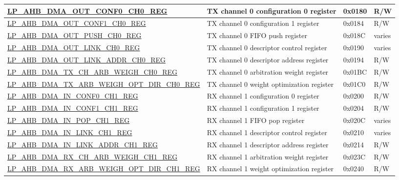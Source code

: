 \begin{longtable}{ | l | p{10cm} | p{1.3cm} | l | }
\hyperref[regdesc:LPAHBDMAOUTCONF0CHNREG]{LP\_AHB\_DMA\_OUT\_CONF0\_CH0\_REG} & TX channel 0 configuration 0 register & 0x0180 & R/W \\ \hline
\hyperref[regdesc:LPAHBDMAOUTCONF1CHNREG]{LP\_AHB\_DMA\_OUT\_CONF1\_CH0\_REG} & TX channel 0 configuration 1 register & 0x0184 & R/W \\ \hline
\hyperref[regdesc:LPAHBDMAOUTPUSHCHNREG]{LP\_AHB\_DMA\_OUT\_PUSH\_CH0\_REG} & TX channel 0 FIFO push register & 0x018C & varies \\ \hline
\hyperref[regdesc:LPAHBDMAOUTLINKCHNREG]{LP\_AHB\_DMA\_OUT\_LINK\_CH0\_REG} & TX channel 0 descriptor control register & 0x0190 & varies \\ \hline
\hyperref[regdesc:LPAHBDMAOUTLINKADDRCHNREG]{LP\_AHB\_DMA\_OUT\_LINK\_ADDR\_CH0\_REG} & TX channel 0 descriptor address register & 0x0194 & R/W \\ \hline
\hyperref[regdesc:LPAHBDMATXCHARBWEIGHCHNREG]{LP\_AHB\_DMA\_TX\_CH\_ARB\_WEIGH\_CH0\_REG} & TX channel 0 arbitration weight register & 0x01BC & R/W \\ \hline
\hyperref[regdesc:LPAHBDMATXARBWEIGHOPTDIRCHNREG]{LP\_AHB\_DMA\_TX\_ARB\_WEIGH\_OPT\_DIR\_CH0\_REG} & TX channel 0 weight optimization register & 0x01C0 & R/W \\ \hline
\hyperref[regdesc:LPAHBDMAINCONF0CHNREG]{LP\_AHB\_DMA\_IN\_CONF0\_CH1\_REG} & RX channel 1 configuration 0 register & 0x0200 & R/W \\ \hline
\hyperref[regdesc:LPAHBDMAINCONF1CHNREG]{LP\_AHB\_DMA\_IN\_CONF1\_CH1\_REG} & RX channel 1 configuration 1 register & 0x0204 & R/W \\ \hline
\hyperref[regdesc:LPAHBDMAINPOPCHNREG]{LP\_AHB\_DMA\_IN\_POP\_CH1\_REG} & RX channel 1 FIFO pop register & 0x020C & varies \\ \hline
\hyperref[regdesc:LPAHBDMAINLINKCHNREG]{LP\_AHB\_DMA\_IN\_LINK\_CH1\_REG} & RX channel 1 descriptor control register & 0x0210 & varies \\ \hline
\hyperref[regdesc:LPAHBDMAINLINKADDRCHNREG]{LP\_AHB\_DMA\_IN\_LINK\_ADDR\_CH1\_REG} & RX channel 1 descriptor address register & 0x0214 & R/W \\ \hline
\hyperref[regdesc:LPAHBDMARXCHARBWEIGHCHNREG]{LP\_AHB\_DMA\_RX\_CH\_ARB\_WEIGH\_CH1\_REG} & RX channel 1 arbitration weight register & 0x023C & R/W \\ \hline
\hyperref[regdesc:LPAHBDMARXARBWEIGHOPTDIRCHNREG]{LP\_AHB\_DMA\_RX\_ARB\_WEIGH\_OPT\_DIR\_CH1\_REG} & RX channel 1 weight optimization register & 0x0240 & R/W \\ \hline

\end{longtable}
